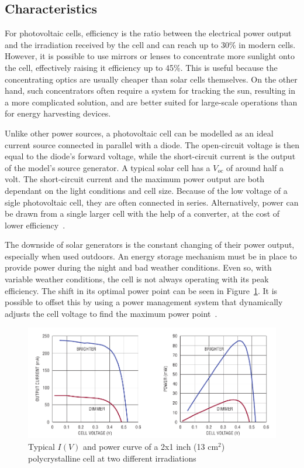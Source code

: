 \documentclass[a4paper,10pt]{article}
\begin{document}
\subsection{Characteristics}

For photovoltaic cells, efficiency is the ratio between the electrical power output and the irradiation received by the cell and can reach up to 30\% in modern cells. However, it is possible to use mirrors or lenses to concentrate more sunlight onto the cell, effectively raising it efficiency up to 45\%. This is useful because the concentrating optics are usually cheaper than solar cells themselves. On the other hand, such concentrators often require a system for tracking the sun, resulting in a more complicated solution, and are better suited for large-scale operations than for energy harvesting devices. 

Unlike other power sources, a photovoltaic cell can be modelled as an ideal current source connected in parallel with a diode. The open-circuit voltage is then equal to the diode's forward voltage, while the short-circuit current is the output of the model's source generator. A typical solar cell has a $V_{oc}$ of around half a volt. The short-circuit current and the maximum power output are both dependant on the light conditions and cell size. Because of the low voltage of a sigle photovoltaic cell, they are often connected in series. Alternatively, power can be drawn from a single larger cell with the help of a converter, at the cost of lower efficiency~\cite{Burgoine11}. 

The downside of solar generators is the constant changing of their power output, especially when used outdoors. An energy storage mechanism must be in place to provide power during the night and bad weather conditions. Even so, with variable weather conditions, the cell is not always operating with its peak efficiency. The shift in its optimal power point can be seen in Figure~\ref{fig:pv-power-curve}. It is possible to offset this by using a power management system that dynamically adjusts the cell voltage to find the maximum power point~\cite{solar-mppt-ieee}. 

\begin{figure}[h!]
\includegraphics[width=\textwidth]{./Slike/PV-power-curve}
 \caption{Typical $I(V)$ and power curve of a 2x1 inch (13 cm$^2$) polycrystalline cell at two different irradiations~\cite{Burgoine11}}
\label{fig:pv-power-curve}
\end{figure}
\end{document}
